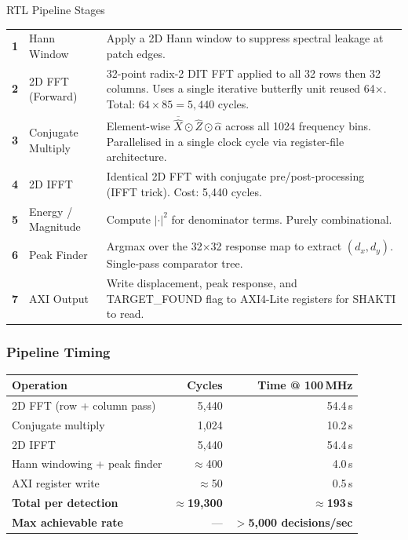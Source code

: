 \documentclass[12pt,a4paper]{article}
\begin{document}
\begin{reportbox}{RTL Pipeline Stages}
\renewcommand{\arraystretch}{1.25}
\begin{tabular}{C{0.5cm} L{3.2cm} L{9.8cm}}
\textbf{1} & Hann Window & Apply a 2D Hann window to suppress spectral leakage at patch edges. \\
\textbf{2} & 2D FFT (Forward) & 32-point radix-2 DIT FFT applied to all 32 rows then 32 columns. Uses a single iterative butterfly unit reused 64$\times$. Total: $64 \times 85 = 5{,}440$ cycles. \\
\textbf{3} & Conjugate Multiply & Element-wise $\overline{\hat{X}} \odot \hat{Z} \odot \hat{\alpha}$ across all 1024 frequency bins. Parallelised in a single clock cycle via register-file architecture. \\
\textbf{4} & 2D IFFT & Identical 2D FFT with conjugate pre/post-processing (IFFT trick). Cost: 5,440 cycles. \\
\textbf{5} & Energy / Magnitude & Compute $|\cdot|^2$ for denominator terms. Purely combinational. \\
\textbf{6} & Peak Finder & Argmax over the 32$\times$32 response map to extract $(d_x, d_y)$. Single-pass comparator tree. \\
\textbf{7} & AXI Output & Write displacement, peak response, and TARGET\_FOUND flag to AXI4-Lite registers for SHAKTI to read. \\
\end{tabular}
\end{reportbox}

\subsubsection{Pipeline Timing}

\begin{center}
\renewcommand{\arraystretch}{1.3}
\begin{tabular}{lrr}
\toprule
\rowcolor{HeaderBg}
\textbf{Operation} & \textbf{Cycles} & \textbf{Time @ 100\,MHz} \\
\midrule
2D FFT (row + column pass) & 5,440 & 54.4\,\textmu{}s \\
Conjugate multiply          & 1,024 & 10.2\,\textmu{}s \\
2D IFFT                     & 5,440 & 54.4\,\textmu{}s \\
Hann windowing + peak finder & $\approx$400 & 4.0\,\textmu{}s \\
AXI register write           & $\approx$50  & 0.5\,\textmu{}s \\
\midrule
\textbf{Total per detection} & \textbf{$\approx$19,300} & \textbf{$\approx$193\,\textmu{}s} \\
\midrule
\textbf{Max achievable rate} & --- & \textbf{$>$5,000 decisions/sec} \\
\bottomrule
\end{tabular}
\end{center}
\end{document}
